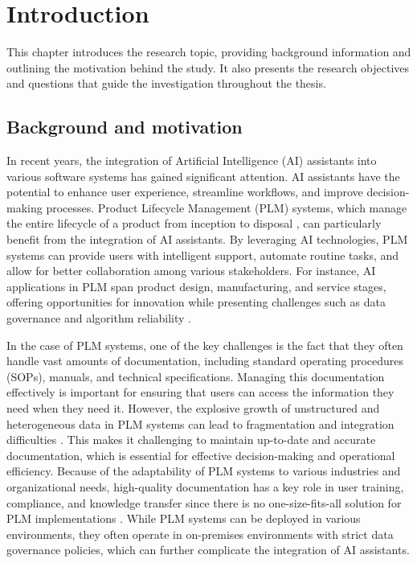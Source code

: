 \chapter{Introduction}
\label{ch:introduction}

This chapter introduces the research topic, providing background information and outlining the motivation behind the study. It also presents the research objectives and questions that guide the investigation throughout the thesis.

\section{Background and motivation}
\label{sec:background-and-motivation}

In recent years, the integration of Artificial Intelligence (AI) assistants into various software systems has gained significant attention. AI assistants have the potential to enhance user experience, streamline workflows, and improve decision-making processes. Product Lifecycle Management (PLM) systems, which manage the entire lifecycle of a product from inception to disposal \parencite{stark_product_2015}, can particularly benefit from the integration of AI assistants. By leveraging AI technologies, PLM systems can provide users with intelligent support, automate routine tasks, and allow for better collaboration among various stakeholders. For instance, AI applications in PLM span product design, manufacturing, and service stages, offering opportunities for innovation while presenting challenges such as data governance and algorithm reliability \parencite{wang_artificial_2021}.

In the case of PLM systems, one of the key challenges is the fact that they often handle vast amounts of documentation, including standard operating procedures (SOPs), manuals, and technical specifications. Managing this documentation effectively is important for ensuring that users can access the information they need when they need it. However, the explosive growth of unstructured and heterogeneous data in PLM systems can lead to fragmentation and integration difficulties \parencite{wang_artificial_2021}. This makes it challenging to maintain up-to-date and accurate documentation, which is essential for effective decision-making and operational efficiency. Because of the adaptability of PLM systems to various industries and organizational needs, high-quality documentation has a key role in user training, compliance, and knowledge transfer since there is no one-size-fits-all solution for PLM implementations \parencite{stark_product_2015-1}. While PLM systems can be deployed in various environments, they often operate in on-premises environments with strict data governance policies, which can further complicate the integration of AI assistants.


